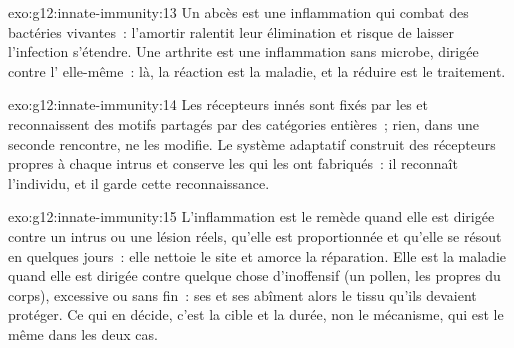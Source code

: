 \begin{solution}{exo:g12:innate-immunity:13}
Un abcès est une inflammation qui combat des bactéries vivantes~:
l'amortir ralentit leur élimination et risque de laisser l'infection
s'étendre. Une arthrite est une inflammation sans microbe, dirigée
contre l' elle-même~: là, la réaction est la maladie, et
la réduire est le traitement.
\end{solution}

\begin{solution}{exo:g12:innate-immunity:14}
Les récepteurs innés sont fixés par les  et reconnaissent des
motifs partagés par des catégories entières~; rien, dans une seconde
rencontre, ne les modifie. Le système adaptatif construit des
récepteurs propres à chaque intrus et conserve les  qui les
ont fabriqués~: il reconnaît l'individu, et il garde cette
reconnaissance.
\end{solution}

\begin{solution}{exo:g12:innate-immunity:15}
L'inflammation est le remède quand elle est dirigée contre un intrus
ou une lésion réels, qu'elle est proportionnée et qu'elle se résout en
quelques jours~: elle nettoie le site et amorce la réparation. Elle
est la maladie quand elle est dirigée contre quelque chose
d'inoffensif (un pollen, les propres  du corps),
excessive ou sans fin~: ses  et ses  abîment alors
le tissu qu'ils devaient protéger. Ce qui en décide, c'est la cible et
la durée, non le mécanisme, qui est le même dans les deux cas.
\end{solution}

